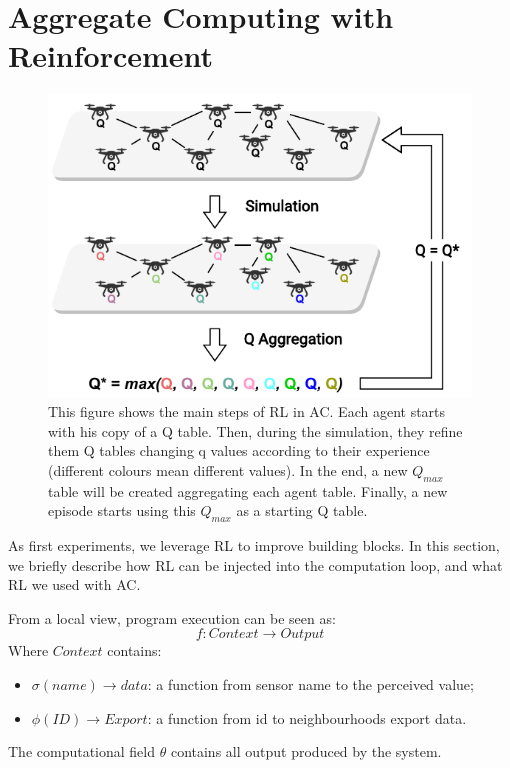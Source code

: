 \documentclass[conference]{IEEEtran}
\begin{document}
\section{Aggregate Computing with Reinforcement}\label{aggregate-and-rl}
\begin{figure}
  \centering
  \includegraphics[width=\linewidth]{img/algorithm-learning.pdf}
  \caption{This figure shows the main steps of RL in AC.
  Each agent starts with his copy of a Q table. 
  Then, during the simulation, they refine them Q tables changing q values according to their experience (different colours mean different values). 
  In the end, a new $Q_{max}$ table will be created aggregating each agent table. 
  Finally, a new episode starts using this $Q_{max}$ as a starting Q table.
  }
  \label{fig:aggregate-q-learning}
\end{figure}
As first experiments, we leverage RL to improve building blocks. 
% 
In this section, we briefly describe how RL can be injected into the computation loop,
 and what RL we used with AC.

From a local view, program execution can be seen as:
$$
f : \textit{Context} \rightarrow \textit{Output}
$$
Where $\textit{Context}$ contains:
\begin{itemize}
  \item $\sigma(name) \rightarrow \textit{data}$: a function from sensor name to the perceived value;
  \item $\phi(\textit{ID}) \rightarrow \textit{Export}$: a function from id to neighbourhoods export data.
\end{itemize}
The computational field $\theta$ contains all output produced by the system.
\end{document}
